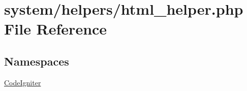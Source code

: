 \hypertarget{html__helper_8php}{\section{system/helpers/html\-\_\-helper.php File Reference}
\label{html__helper_8php}
}
\subsection*{Namespaces}
\begin{DoxyCompactItemize}
\item 
\hyperlink{namespace_code_igniter}{Code\-Igniter}
\end{DoxyCompactItemize}
